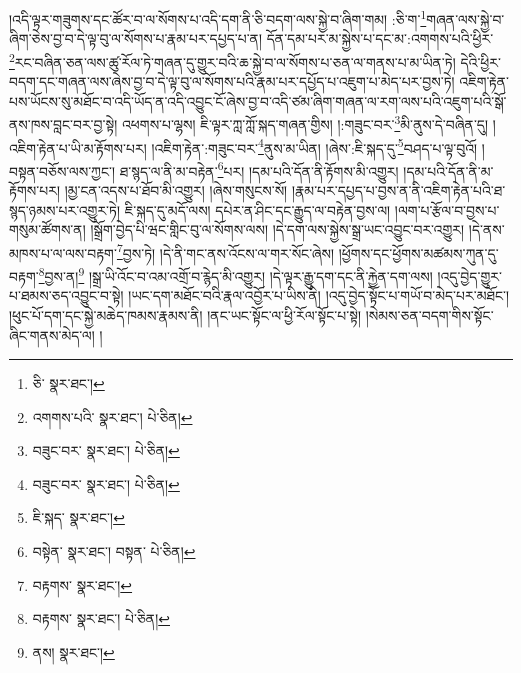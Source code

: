 །འདི་ལྟར་གཟུགས་དང་ཚོར་བ་ལ་སོགས་པ་འདི་དག་ནི་ཅི་བདག་ལས་སྐྱེ་བ་ཞིག་གམ། :ཅི་ག་\footnote{ཅི་  སྣར་ཐང་། }གཞན་ལས་སྐྱེ་བ་ཞིག་ཅེས་བྱ་བ་དེ་ལྟ་བུ་ལ་སོགས་པ་རྣམ་པར་དཔྱད་པ་ན། དོན་དམ་པར་མ་སྐྱེས་པ་དང་མ་:འགགས་པའི་ཕྱིར་\footnote{འགགས་པའི་  སྣར་ཐང་།  པེ་ཅིན། }རང་བཞིན་ཅན་ལས་ཚུ་རོལ་ཏེ་གཞན་དུ་གྱུར་བའི་ཆ་སྐྱེ་བ་ལ་སོགས་པ་ཅན་ལ་གནས་པ་མ་ཡིན་ཏེ། དེའི་ཕྱིར་བདག་དང་གཞན་ལས་ཞེས་བྱ་བ་དེ་ལྟ་བུ་ལ་སོགས་པའི་རྣམ་པར་དཔྱོད་པ་འཇུག་པ་མེད་པར་བྱས་ཏེ། འཇིག་རྟེན་པས་ཡོངས་སུ་མཐོང་བ་འདི་ཡོད་ན་འདི་འབྱུང་ངོ་ཞེས་བྱ་བ་འདི་ཙམ་ཞིག་གཞན་ལ་རག་ལས་པའི་འཇུག་པའི་སྒོ་ནས་ཁས་བླང་བར་བྱ་སྟེ། འཕགས་པ་ལྷས། ཇི་ལྟར་ཀླ་ཀློ་སྐད་གཞན་གྱིས། །:གཟུང་བར་\footnote{བཟུང་བར་  སྣར་ཐང་།  པེ་ཅིན། }མི་ནུས་དེ་བཞིན་དུ། །འཇིག་རྟེན་པ་ཡི་མ་རྟོགས་པར། །འཇིག་རྟེན་:གཟུང་བར་\footnote{བཟུང་བར་  སྣར་ཐང་།  པེ་ཅིན། }ནུས་མ་ཡིན། །ཞེས་:ཇི་སྐད་དུ་\footnote{ཇི་སྐད་  སྣར་ཐང་། }བཤད་པ་ལྟ་བུའོ། །བསྟན་བཅོས་ལས་ཀྱང་། ཐ་སྙད་ལ་ནི་མ་བརྟེན་\footnote{བསྟེན་  སྣར་ཐང་། བསྟན་  པེ་ཅིན། }པར། །དམ་པའི་དོན་ནི་རྟོགས་མི་འགྱུར། །དམ་པའི་དོན་ནི་མ་རྟོགས་པར། །མྱ་ངན་འདས་པ་ཐོབ་མི་འགྱུར། །ཞེས་གསུངས་སོ། །རྣམ་པར་དཔྱད་པ་བྱས་ན་ནི་འཇིག་རྟེན་པའི་ཐ་སྙད་ཉམས་པར་འགྱུར་ཏེ། ཇི་སྐད་དུ་མདོ་ལས། དཔེར་ན་ཤིང་དང་རྒྱུད་ལ་བརྟེན་བྱས་ལ། །ལག་པ་རྩོལ་བ་བྱས་པ་གསུམ་ཚོགས་ན། །སྒྲོག་བྱེད་པི་ཝང་གླིང་བུ་ལ་སོགས་ལས། །དེ་དག་ལས་སྐྱེས་སྒྲ་ཡང་འབྱུང་བར་འགྱུར། །དེ་ནས་མཁས་པ་ལ་ལས་བརྟག་\footnote{བརྟགས་  སྣར་ཐང་། }བྱས་ཏེ། །དེ་ནི་གང་ནས་འོངས་ལ་གར་སོང་ཞེས། །ཕྱོགས་དང་ཕྱོགས་མཚམས་ཀུན་དུ་བརྟག་\footnote{བརྟགས་  སྣར་ཐང་།  པེ་ཅིན། }བྱས་ན།\footnote{ནས།  སྣར་ཐང་། } །སྒྲ་ཡི་འོང་བ་འམ་འགྲོ་བ་རྙེད་མི་འགྱུར། །དེ་ལྟར་རྒྱུ་དག་དང་ནི་རྐྱེན་དག་ལས། །འདུ་བྱེད་གྱུར་པ་ཐམས་ཅད་འབྱུང་བ་སྟེ། །ཡང་དག་མཐོང་བའི་རྣལ་འབྱོར་པ་ཡིས་ནི། །འདུ་བྱེད་སྟོང་པ་གཡོ་བ་མེད་པར་མཐོང་། །ཕུང་པོ་དག་དང་སྐྱེ་མཆེད་ཁམས་རྣམས་ནི། །ནང་ཡང་སྟོང་ལ་ཕྱི་རོལ་སྟོང་པ་སྟེ། །སེམས་ཅན་བདག་གིས་སྟོང་ཞིང་གནས་མེད་ལ། །
